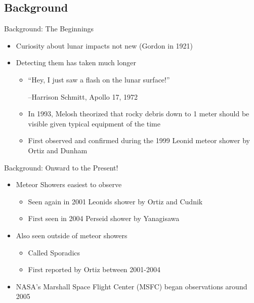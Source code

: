 \documentclass[pdf]{beamer}
\begin{document}
\subsection{Background}
\begin{frame}{Background: The Beginnings}
  \begin{itemize}
	\item Curiosity about lunar impacts not new (Gordon in 1921) \citep{Gordon1921}
	\item Detecting them has taken much longer
	  \begin{itemize}
		\item ``Hey, I just saw a flash on the lunar surface!''\par\hspace{1cm} --Harrison Schmitt, Apollo 17, 1972 \citep{NASA1972}
		\item In 1993, Melosh theorized that rocky debris down to 1 meter should be visible given typical equipment of the time \citep{Melosh1993}
		\item First observed and confirmed during the 1999 Leonid meteor shower by Ortiz and Dunham \citep{Ortiz2000}
	  \end{itemize}
  \end{itemize}
\end{frame}

\begin{frame}{Background: Onward to the Present!}
  \begin{itemize}
	\item Meteor Showers easiest to observe
	  \begin{itemize}
		\item Seen again in 2001 Leonids shower by Ortiz and Cudnik \citep{Ortiz2002,Cudnik2003}
		\item First seen in 2004 Perseid shower by Yanagisawa \citep{Yanagisawa2006}
	  \end{itemize}
	\item Also seen outside of meteor showers
	  \begin{itemize}
		\item Called Sporadics
		\item First reported by Ortiz between 2001-2004 \citep{Ortiz2006}
	  \end{itemize}
	\item NASA's Marshall Space Flight Center (MSFC) began observations around 2005 \citep{Cooke2007}
  \end{itemize}
\end{frame}
\end{document}
